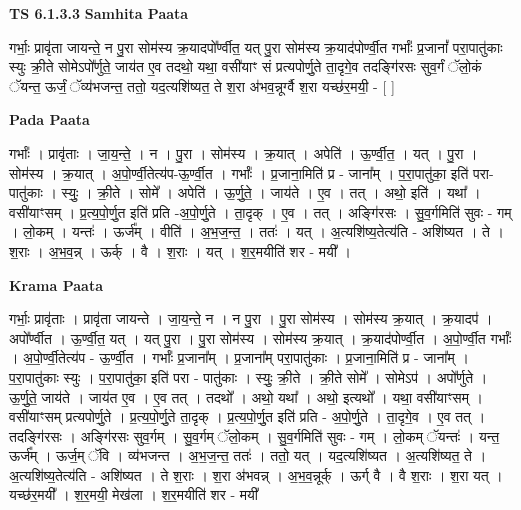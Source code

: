 \documentclass[17pt]{extarticle}
\begin{document}
\textbf{TS 6.1.3.3 } \newline
\textbf{Samhita Paata} \newline

गर्भाः॒ प्रावृ॑ता जायन्ते॒ न पु॒रा सोम॑स्य क्र॒यादपो᳚र्ण्वीत॒ यत् पु॒रा सोम॑स्य क्र॒याद॑पोर्ण्वी॒त गर्भाः᳚ प्र॒जानां᳚ परा॒पातु॑काः स्युः क्री॒ते सोमेऽपो᳚र्णुते॒ जाय॑त ए॒व तदथो॒ यथा॒ वसी॑याꣳ सं प्रत्यपोर्णु॒ते ता॒दृगे॒व तदङ्गि॑रसः सुव॒र्गं ॅलो॒कं ॅयन्त॒ ऊर्जं॒ ॅव्य॑भजन्त॒ ततो॒ यद॒त्यशि॑ष्यत॒ ते श॒रा अ॑भव॒न्नूर्ग्वै श॒रा यच्छ॑र॒मयी॒ - [  ] \newline

\textbf{Pada Paata} \newline

गर्भाः᳚ । प्रावृ॑ताः । जा॒य॒न्ते॒ । न । पु॒रा । सोम॑स्य । क्र॒यात् । अपेति॑ । ऊ॒र्ण्वी॒त॒ । यत् । पु॒रा । सोम॑स्य । क्र॒यात् । अ॒पो॒र्ण्वी॒तेत्य॑प-ऊ॒र्ण्वी॒त । गर्भाः᳚ । प्र॒जाना॒मिति॑ प्र - जाना᳚म् । प॒रा॒पातु॑का॒ इति॑ परा-पातु॑काः । स्युः॒ । क्री॒ते । सोमे᳚ । अपेति॑ । ऊ॒र्णु॒ते॒ । जाय॑ते । ए॒व । तत् । अथो॒ इति॑ । यथा᳚ । वसी॑याꣳसम् । प्र॒त्य॒पो॒र्णु॒त इति॑ प्रति -अ॒पो॒र्णु॒ते । ता॒दृक् । ए॒व । तत् । अङ्गि॑रसः । सु॒व॒र्गमिति॑ सुवः - गम् । लो॒कम् । यन्तः॑ । ऊर्ज᳚म् । वीति॑ । अ॒भ॒ज॒न्त॒ । ततः॑ । यत् । अ॒त्यशि॑ष्य॒तेत्य॑ति - अशि॑ष्यत । ते । श॒राः । अ॒भ॒व॒न्न् । ऊर्क् । वै । श॒राः । यत् । श॒र॒मयीति॑ शर - मयी᳚ ।  \newline


\textbf{Krama Paata} \newline

गर्भाः॒ प्रावृ॑ताः । प्रावृ॑ता जायन्ते । जा॒य॒न्ते॒ न । न पु॒रा । पु॒रा सोम॑स्य । सोम॑स्य क्र॒यात् । क्र॒यादप॑ । अपो᳚र्ण्वीत । ऊ॒र्ण्वी॒त॒ यत् । यत् पु॒रा । पु॒रा सोम॑स्य । सोम॑स्य क्र॒यात् । क्र॒याद॑पोर्ण्वी॒त । अ॒पो॒र्ण्वी॒त गर्भाः᳚ । अ॒पो॒र्ण्वी॒तेत्य॑प - ऊ॒र्ण्वी॒त । गर्भाः᳚ प्र॒जाना᳚म् । प्र॒जाना᳚म् परा॒पातु॑काः । प्र॒जाना॒मिति॑ प्र - जाना᳚म् । प॒रा॒पातु॑काः स्युः । प॒रा॒पातु॑का॒ इति॑ परा - पातु॑काः । स्युः॒ क्री॒ते । क्री॒ते सोमे᳚ । सोमेऽप॑ । अपो᳚र्णुते । ऊ॒र्णु॒ते॒ जाय॑ते । जाय॑त ए॒व । ए॒व तत् । तदथो᳚ । अथो॒ यथा᳚ । अथो॒ इत्यथो᳚ । यथा॒ वसी॑याꣳसम् । वसी॑याꣳसम् प्रत्यपोर्णु॒ते । प्र॒त्य॒पो॒र्णु॒ते ता॒दृक् । प्र॒त्य॒पो॒र्णु॒त इति॑ प्रति - अ॒पो॒र्णु॒ते । ता॒दृगे॒व । ए॒व तत् । तदङ्‍गि॑रसः । अङ्‍गि॑रसः सुव॒र्गम् । सु॒व॒र्गम् ॅलो॒कम् । सु॒व॒र्गमिति॑ सुवः - गम् । लो॒कम् ॅयन्तः॑ । यन्त॒ ऊर्ज᳚म् । ऊर्ज॒म् ॅवि । व्य॑भजन्त । अ॒भ॒ज॒न्त॒ ततः॑ । ततो॒ यत् । यद॒त्यशि॑ष्यत । अ॒त्यशि॑ष्यत॒ ते । अ॒त्यशि॑ष्य॒तेत्य॑ति - अशि॑ष्यत । ते श॒राः । श॒रा अ॑भवन्न् । अ॒भ॒व॒न्नूर्क् । ऊर्ग् वै । वै श॒राः । श॒रा यत् । यच्छ॑र॒मयी᳚ । श॒र॒मयी॒ मेख॑ला । श॒र॒मयीति॑ शर - मयी᳚ \newline
\end{document}
